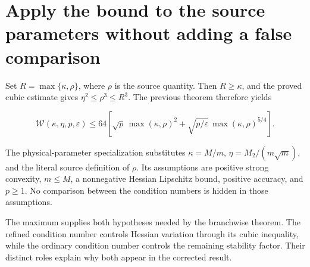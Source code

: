 \documentclass[11pt,a4paper]{article}
\begin{document}
\section{\texorpdfstring{Apply the bound to the source parameters without adding a false comparison}{Apply the bound to the source parameters without adding a false comparison}}


Set \(R=\max\{\kappa,\rho\}\), where \(\rho\) is the source quantity. Then \(R\ge\kappa\), and the proved cubic estimate gives \(\eta^2\le\rho^3\le R^3\). The previous theorem therefore yields

\[\mathcal W(\kappa,\eta,p,\varepsilon)\le64\left[\sqrt p\,\max(\kappa,\rho)^2+\sqrt{p/\varepsilon}\,\max(\kappa,\rho)^{5/4}\right].\]

The physical-parameter specialization substitutes \(\kappa=M/m\), \(\eta=M_2/(m\sqrt m)\), and the literal source definition of \(\rho\). Its assumptions are positive strong convexity, \(m\le M\), a nonnegative Hessian Lipschitz bound, positive accuracy, and \(p\ge1\). No comparison between the condition numbers is hidden in those assumptions.



The maximum supplies both hypotheses needed by the branchwise theorem. The refined condition number controls Hessian variation through its cubic inequality, while the ordinary condition number controls the remaining stability factor. Their distinct roles explain why both appear in the corrected result.
\end{document}
